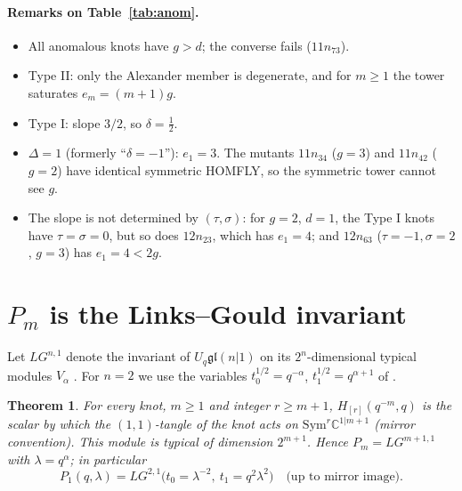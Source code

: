 \documentclass[11pt]{article}
\newtheorem{theorem}{Theorem}
\theoremstyle{definition}
\theoremstyle{remark}
\newcommand{\gl}{\mathfrak{gl}}
\newcommand{\Sym}{\mathrm{Sym}}
\begin{document}
\paragraph{Remarks on Table~\ref{tab:anom}.}
\begin{itemize}
\item All anomalous knots have $g>d$; the converse fails ($11n_{73}$).
\item Type II: only the Alexander member is degenerate, and for $m\ge1$ the tower saturates $e_m=(m+1)g$.
\item Type I: slope $3/2$, so $\delta=\frac12$.
\item $\Delta=1$ (formerly ``$\delta=-1$''): $e_1=3$.  The mutants $11n_{34}$ ($g=3$) and $11n_{42}$ ($g=2$) have
identical symmetric HOMFLY, so the symmetric tower cannot see $g$.
\item The slope is not determined by $(\tau,\sigma)$: for $g=2$, $d=1$, the Type I knots have $\tau=\sigma=0$,
but so does $12n_{23}$, which has $e_1=4$; and $12n_{63}$ ($\tau=-1,\sigma=2$, $g=3$) has $e_1=4<2g$.
\end{itemize}

\section{$P_m$ is the Links--Gould invariant}\label{sec:lg}

Let $LG^{n,1}$ denote the invariant of $U_q\gl(n|1)$ on its $2^n$-dimensional typical modules $V_\alpha$
\cite{DKL,MW}.  For $n=2$ we use the variables $t_0^{1/2}=q^{-\alpha}$, $t_1^{1/2}=q^{\alpha+1}$ of \cite{KT}.

\begin{theorem}\label{thm:lg}
For every knot, $m\ge1$ and integer $r\ge m+1$, $H_{[r]}(q^{-m},q)$ is the scalar by which the $(1,1)$-tangle
of the knot acts on $\Sym^r\mathbb{C}^{1|m+1}$ (mirror convention).  This module is typical of dimension
$2^{m+1}$.  Hence $P_m=LG^{m+1,1}$ with $\lambda=q^\alpha$; in particular
\[
  P_1(q,\lambda)=LG^{2,1}\big(t_0=\lambda^{-2},\ t_1=q^2\lambda^2\big)\quad\text{(up to mirror image).}
\]
\end{theorem}
\end{document}
